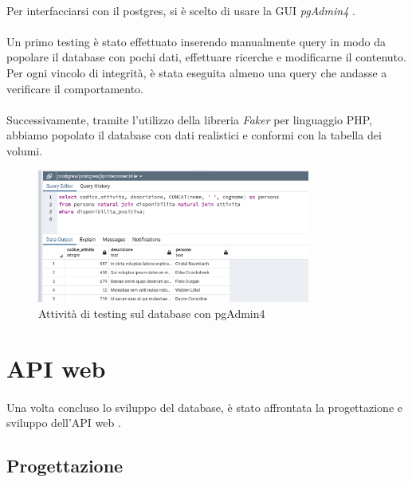 \documentclass[11pt,a4paper,english]{article}
\begin{document}
\paragraph{} Per interfacciarsi con il postgres, si è scelto di usare la GUI \emph{pgAdmin4} \cite{pgadmin}.

\paragraph{} Un primo testing è stato effettuato inserendo manualmente query in modo da popolare il database con pochi dati, effettuare ricerche e modificarne il contenuto. Per ogni vincolo di integrità, è stata eseguita almeno una query che andasse a verificare il comportamento. 

\paragraph{} Successivamente, tramite l'utilizzo della libreria \emph{Faker} per linguaggio PHP, abbiamo popolato il database con dati realistici e conformi con la tabella dei volumi.

\begin{figure}[H]
    \centering
    \includegraphics[width=0.8\textwidth]{img/query_esempio.png}
    \caption{Attività di testing sul database con pgAdmin4}
\end{figure}


\newpage
\section{API web}

\paragraph{} Una volta concluso lo sviluppo del database, è stato affrontata la progettazione e sviluppo dell'API web \cite{restapi}.

\subsection{Progettazione}
\end{document}
